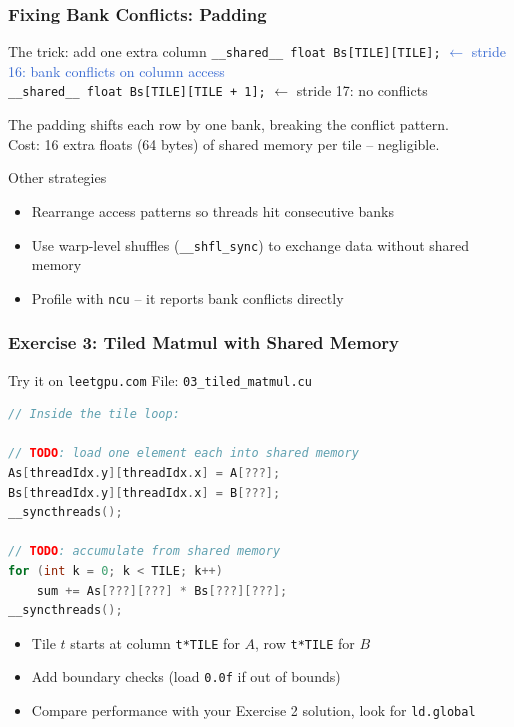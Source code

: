 \documentclass[aspectratio=169]{beamer}
\begin{document}
\begin{frame}
	\frametitle{Fixing Bank Conflicts: Padding}
	\begin{block}{The trick: add one extra column}
		\texttt{\scriptsize \_\_shared\_\_ float Bs[TILE][TILE];} \hfill \textcolor{highlight}{$\leftarrow$ stride 16: bank conflicts on column access} \\[0.3em]
		\texttt{\scriptsize \_\_shared\_\_ float Bs[TILE][TILE + 1];} \hfill \textcolor{codegreen}{$\leftarrow$ stride 17: no conflicts}
		\vspace{0.3em}

		The padding shifts each row by one bank, breaking the conflict pattern. \\
		Cost: 16 extra floats (64 bytes) of shared memory per tile -- negligible.
	\end{block}
	\vspace{0.5em}
	\begin{block}{Other strategies}
		\begin{itemize}
			\item Rearrange access patterns so threads hit consecutive banks
			\item Use warp-level shuffles (\texttt{\_\_shfl\_sync}) to exchange data without shared memory
			\item Profile with \texttt{ncu} -- it reports bank conflicts directly
		\end{itemize}
	\end{block}
\end{frame}

\begin{frame}[fragile]
	\frametitle{Exercise 3: Tiled Matmul with Shared Memory}
	\begin{block}{Try it on \texttt{leetgpu.com}}
		File: \texttt{03\_tiled\_matmul.cu}
	\end{block}
	\vspace{0.1em}
	\begin{lstlisting}[language=C]
// Inside the tile loop:

// TODO: load one element each into shared memory
As[threadIdx.y][threadIdx.x] = A[???];
Bs[threadIdx.y][threadIdx.x] = B[???];
__syncthreads();

// TODO: accumulate from shared memory
for (int k = 0; k < TILE; k++)
    sum += As[???][???] * Bs[???][???];
__syncthreads();
	\end{lstlisting}
	\vspace{0.1em}
	\begin{itemize}
		\item Tile $t$ starts at column \texttt{t*TILE} for $A$, row \texttt{t*TILE} for $B$
		\item Add boundary checks (load \texttt{0.0f} if out of bounds)
		\item Compare performance with your Exercise 2 solution, look for \texttt{ld.global}
	\end{itemize}
\end{frame}
\end{document}
